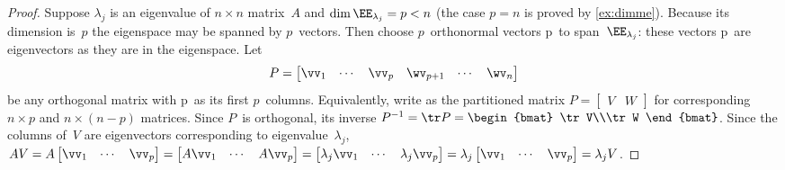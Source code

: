 \begin{proof} 
Suppose \(\lambda_j\) is an eigenvalue of \(n\times n\) matrix~\(A\) and \(\dim\EE_{\lambda_j}=p<n\) (the case \(p=n\) is proved by \autoref{ex:dimme}).
Because its dimension is~\(p\) the eigenspace may be spanned by \(p\)~vectors.
Then choose \(p\)~orthonormal vectors \hlist\vv p\ to span~\(\EE_{\lambda_j}\): these vectors \hlist\vv p\ are eigenvectors as they are in the eigenspace.
Let
\begin{equation*}
P=\begin{bmatrix} \vv_1&\cdots&\vv_p&\wv_{p+1}&\cdots&\wv_n \end{bmatrix}
\end{equation*}
be any orthogonal matrix with \hlist\vv p\ as its first \(p\)~columns.
Equivalently, write as the partitioned matrix \(P=\begin{bmatrix} V&W \end{bmatrix}\) for corresponding \(n\times p\) and \(n\times(n-p)\) matrices.
Since \(P\)~is orthogonal, its inverse \(P^{-1}=\tr P=\begin{bmat} \tr V\\\tr W \end{bmat}\).
Since the columns of~\(V\) are eigenvectors corresponding to eigenvalue~\(\lambda_j\), \(AV=A\begin{bmatrix} \vv_1&\cdots&\vv_p \end{bmatrix}
=\begin{bmatrix} A\vv_1&\cdots&A\vv_p \end{bmatrix}
=\begin{bmatrix} \lambda_j\vv_1&\cdots&\lambda_j\vv_p \end{bmatrix}
=\lambda_j\begin{bmatrix} \vv_1&\cdots&\vv_p \end{bmatrix}
=\lambda_jV\).


\end{proof}
